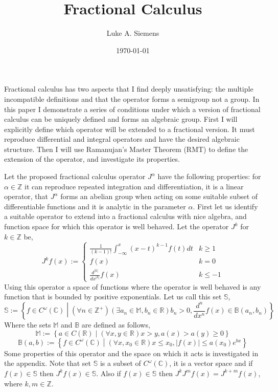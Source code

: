 \documentclass[%
 onecolumn,
 amsmath, amssymb, aps, pra, 10pt
]{revtex4-2}
\begin{document}
\title{Fractional Calculus}%
\author{Luke A. Siemens}
\noaffiliation
\date{\today}
\maketitle

Fractional calculus has two aspects that I find deeply unsatisfying: the multiple incompatible definitions and that the operator forms a semigroup not a group. In this paper I demonstrate a series of conditions under which a version of fractional calculus can be uniquely defined and forms an algebraic group. First I will explicitly define which operator will be extended to a fractional version. It must reproduce differential and integral operators and have the desired algebraic structure. Then I will use Ramanujan's Master Theorem (RMT) to define the extension of the operator, and investigate its properties.

Let the proposed fractional calculus operator $J^\alpha$ have the following properties: for $\alpha \in \mathbb{Z}$ it can reproduce repeated integration and differentiation, it is a linear operator, that $J^\alpha$ forms an abelian group when acting on some suitable subset of differentiable functions and it is analytic in the parameter $\alpha$. First let us identify a suitable operator to extend into a fractional calculus with nice algebra, and function space for which this operator is well behaved. Let the operator $J^k$ for $k \in \mathbb{Z}$ be,
\begin{equation}
J^k f(x) := \begin{cases} \frac{1}{(k-1)!}\int_{-\infty}^x (x - t)^{k - 1}f(t)dt & k \geq 1 \\ f(x) & k = 0 \\ \frac{d^{\left|k\right|}}{dx^{\left|k\right|}}f(x) & k \leq -1 \end{cases}
\label{integer_calculus}
\end{equation}
Using this operator a space of functions where the operator is well behaved is any function that is bounded by positive exponentials. Let us call this set $\mathbb{S}$,
\begin{equation}
\mathbb{S} := \left\lbrace f \in C^\omega(\mathbb{C}) \middle| (\forall n \in \mathbb{Z}^+)(\exists a_n \in \mathbb{M}, b_n \in \mathbb{R}) b_n > 0, \frac{d^n}{dx^n}f(x) \in \mathbb{B}(a_n, b_n) \right\rbrace
\label{exponentialy_bounded}
\end{equation}
Where the sets $\mathbb{M}$ and $\mathbb{B}$ are defined as follows,
\[\mathbb{M} := \left\lbrace a \in C(\mathbb{R}) \middle| (\forall x, y \in \mathbb{R}) x > y, a(x) > a(y) \geq 0 \right\rbrace\]
\[\mathbb{B}(a, b) := \left\lbrace f \in C^\omega(\mathbb{C}) \middle| (\forall x, x_0 \in \mathbb{R}) x \leq x_0, |f(x)| \leq a(x_0)e^{bx} \right\rbrace\]
Some properties of this operator and the space on which it acts is investigated in the appendix. Note that set $\mathbb{S}$ is a subset of $C^{\omega}(\mathbb{C})$, it is a vector space and if $f(x) \in \mathbb{S}$ then $J^k f(x) \in \mathbb{S}$. Also if $f(x) \in \mathbb{S}$ then $J^k J^m f(x) = J^{k + m} f(x)$, where $k, m \in \mathbb{Z}$.
\end{document}
